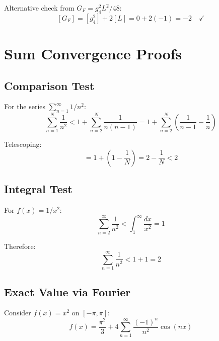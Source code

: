 \documentclass[11pt,a4paper]{article}
\begin{document}
Alternative check from $G_F = g_4^2 L^2 / 48$:
\begin{equation}
\label{eq:gf-dim-alt}
[G_F] = [g_4^2] + 2[L] = 0 + 2(-1) = -2 \quad \checkmark
\end{equation}

\section{Sum Convergence Proofs}
\label{app:sum-proofs}

\subsection{Comparison Test}
\label{app:comparison}

For the series $\sum_{n=1}^\infty 1/n^2$:
\begin{equation}
\label{eq:comparison-bound}
\sum_{n=1}^N \frac{1}{n^2} < 1 + \sum_{n=2}^N \frac{1}{n(n-1)} = 1 + \sum_{n=2}^N \left(\frac{1}{n-1} - \frac{1}{n}\right)
\end{equation}

Telescoping:
\begin{equation}
\label{eq:telescope}
= 1 + \left(1 - \frac{1}{N}\right) = 2 - \frac{1}{N} < 2
\end{equation}

\subsection{Integral Test}
\label{app:integral-test}

For $f(x) = 1/x^2$:
\begin{equation}
\label{eq:integral-bound}
\sum_{n=2}^\infty \frac{1}{n^2} < \int_1^\infty \frac{dx}{x^2} = 1
\end{equation}

Therefore:
\begin{equation}
\label{eq:sum-bound}
\sum_{n=1}^\infty \frac{1}{n^2} < 1 + 1 = 2
\end{equation}

\subsection{Exact Value via Fourier}
\label{app:fourier}

Consider $f(x) = x^2$ on $[-\pi, \pi]$:
\begin{equation}
\label{eq:fourier-f}
f(x) = \frac{\pi^2}{3} + 4\sum_{n=1}^\infty \frac{(-1)^n}{n^2} \cos(nx)
\end{equation}
\end{document}
